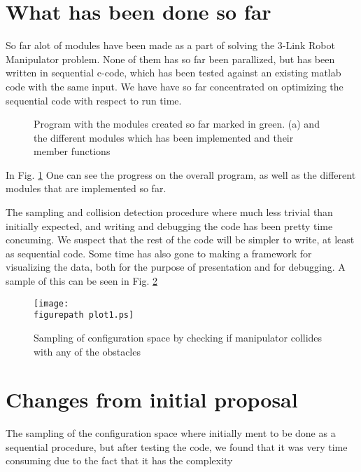 \newcommand{\figurepath}{./figures/}
\newcommand{\figurescale}{0.22}
\newcommand{\codepath}{../matlab/}
\setlength\parindent{24pt}


\section*{What has been done so far}

So far alot of modules have been made as a part of solving the 3-Link Robot Manipulator problem. None of them has so far been parallized, but has been written in sequential c-code, which has been tested against an existing matlab code with the same input. We have have so far concentrated on optimizing the sequential code with respect to run time. 

\begin{figure}[h!] 
 \center 
 \caption{  Program with the modules created so far marked in green. (a) and the different modules which has been implemented and their member functions \label{fig:prog1}}
 \end{figure}

In Fig. \ref{fig:prog1} One can see the progress on the overall program, as well as the different modules that are implemented so far. 

The sampling and collision detection procedure where much less trivial than initially expected, and writing and debugging the code has been pretty time concuming. We suspect that the rest of the code will be simpler to write, at least as sequential code. Some time has also gone to making a framework for visualizing the data, both for the purpose of presentation and for debugging. A sample of this can be seen in Fig. \ref{fig:plot1} 

\begin{figure}[h!] 
 \center 
 \texttt{[image: \\figurepath plot1.ps]}
 \caption{ Sampling of configuration space by checking if manipulator collides with any of the obstacles \label{fig:plot1}}
 \end{figure}


\section*{Changes from initial proposal}

The sampling of the configuration space where initially ment to be done as a sequential procedure, but after testing the code, we found that it was very time consuming due to the fact that  it has the complexity 

